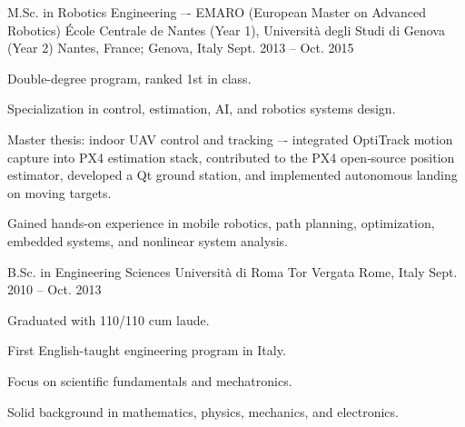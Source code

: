 


\begin{cventries}

  \cventry
  {M.Sc. in Robotics Engineering –- EMARO (European Master on Advanced Robotics)} %
  {École Centrale de Nantes (Year 1), Università degli Studi di Genova (Year 2)} %
  {Nantes, France; Genova, Italy} %
  {Sept. 2013 -- Oct. 2015} %
  {
    \begin{cvitems}
    \item {Double-degree program, ranked 1st in class.}
    \item {Specialization in control, estimation, AI, and robotics systems design.}
    \item {Master thesis: indoor UAV control and tracking –- integrated OptiTrack motion capture into PX4 estimation stack, contributed to the PX4 open‑source position estimator, developed a Qt ground station, and implemented autonomous landing on moving targets.}
    \end{cvitems}
    \begin{cvparagraph}
      Gained hands-on experience in mobile robotics, path planning, optimization, embedded systems, and nonlinear system analysis.
    \end{cvparagraph}
  }

  \cventry
  {B.Sc. in Engineering Sciences} %
  {Università di Roma Tor Vergata} %
  {Rome, Italy} %
  {Sept. 2010 -- Oct. 2013} %
  {
    \begin{cvitems}
    \item {Graduated with 110/110 cum laude.}
    \item {First English-taught engineering program in Italy.}
    \item {Focus on scientific fundamentals and mechatronics.}
    \end{cvitems}
    \begin{cvparagraph}
      Solid background in mathematics, physics, mechanics, and electronics.
    \end{cvparagraph}
  }

\end{cventries}

